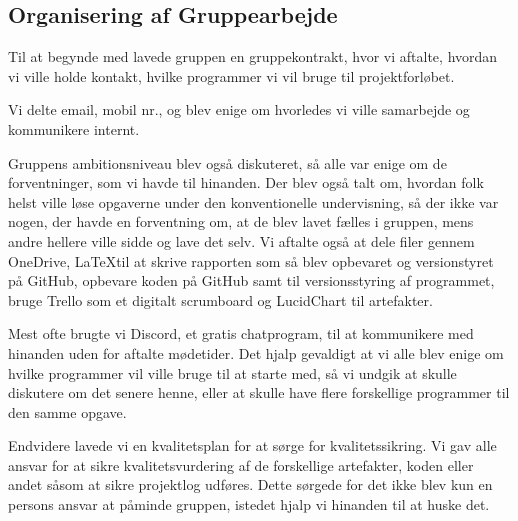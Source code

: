\subsection{Organisering af Gruppearbejde}

Til at begynde med lavede gruppen en gruppekontrakt, hvor vi aftalte, hvordan vi ville holde kontakt, hvilke programmer vi vil bruge til projektforløbet.

Vi delte email, mobil nr., og blev enige om hvorledes vi ville samarbejde og kommunikere internt.

Gruppens ambitionsniveau blev også diskuteret, så alle var enige om de forventninger, som vi havde til hinanden.
Der blev også talt om, hvordan folk helst ville løse opgaverne under den konventionelle undervisning, så der ikke var nogen, der havde en forventning om, at de blev lavet fælles i gruppen, mens andre hellere ville sidde og lave det selv.
Vi aftalte også at dele filer gennem OneDrive, \LaTeX til at skrive rapporten som så blev opbevaret og versionstyret på GitHub, opbevare koden på GitHub samt til versionsstyring af programmet, bruge Trello som et digitalt scrumboard og LucidChart til artefakter.

Mest ofte brugte vi Discord, et gratis chatprogram, til at kommunikere med hinanden uden for aftalte mødetider.
Det hjalp gevaldigt at vi alle blev enige om hvilke programmer vil ville bruge til at starte med, så vi undgik at skulle diskutere om det senere henne, eller at skulle have flere forskellige programmer til den samme opgave.

Endvidere lavede vi en kvalitetsplan for at sørge for kvalitetssikring.
Vi gav alle ansvar for at sikre kvalitetsvurdering af de forskellige artefakter, koden eller andet såsom at sikre projektlog udføres.
Dette sørgede for det ikke blev kun en persons ansvar at påminde gruppen, istedet hjalp vi hinanden til at huske det.

